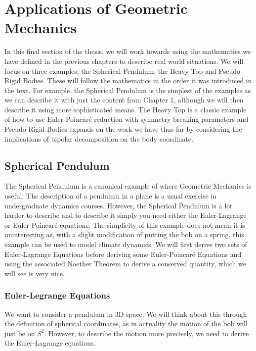 
\section{Applications of Geometric Mechanics}
In this final section of the thesis, we will work towards using the mathematics we have defined in the previous chapters to describe real world situations. We will focus on three examples, the Spherical Pendulum, the Heavy Top and Pseudo Rigid Bodies. These will follow the mathematics in the order it was introduced in the text. For example, the Spherical Pendulum is the simplest of the examples as we can describe it with just the content from Chapter 1, although we will then describe it using more sophisticated means. The Heavy Top is a classic example of how to use Euler-Poincar\'e reduction with symmetry breaking parameters and Pseudo Rigid Bodies expands on the work we have thus far by considering the implications of bipolar decomposition on the body coordinate.

\subsection{Spherical Pendulum}
The Spherical Pendulum is a canonical example of where Geometric Mechanics is useful. The description of a pendulum in a plane is a usual exercise in undergraduate dynamics courses. However, the Spherical Pendulum is a lot harder to describe and to describe it simply you need either the Euler-Lagrange or Euler-Poincar\'e equations. The simplicity of this example does not mean it is uninteresting as, with a slight modification of putting the bob on a spring, this example can be used to model climate dynamics. We will first derive two sets of Euler-Lagrange Equations before deriving some Euler-Poincar\'e Equations and using the associated Noether Theorem to derive a conserved quantity, which we will see is very nice.

\subsubsection{Euler-Legrange Equations}

We want to consider a pendulum in 3D space. We will think about this through the definition of spherical coordinates, as in actuality the motion of the bob will just be on $S^2$. However, to describe the motion more precisely, we need to derive the Euler-Lagrange equations.~\cite{holm_2011}\\

